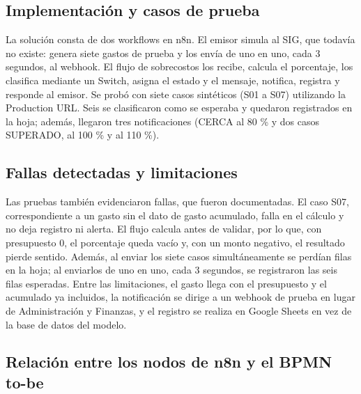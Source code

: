 \documentclass[11pt,letterpaper]{article}
\begin{document}
\subsection{Implementación y casos de prueba}

La solución consta de dos workflows en n8n. El emisor simula al SIG, que todavía no existe: genera siete gastos de prueba y los envía de uno en uno, cada 3 segundos, al webhook. El flujo de sobrecostos los recibe, calcula el porcentaje, los clasifica mediante un Switch, asigna el estado y el mensaje, notifica, registra y responde al emisor. Se probó con siete casos sintéticos (S01 a S07) utilizando la Production URL. Seis se clasificaron como se esperaba y quedaron registrados en la hoja; además, llegaron tres notificaciones (CERCA al 80 \% y dos casos SUPERADO, al 100 \% y al 110 \%).


\subsection{Fallas detectadas y limitaciones}

Las pruebas también evidenciaron fallas, que fueron documentadas. El caso S07, correspondiente a un gasto sin el dato de gasto acumulado, falla en el cálculo y no deja registro ni alerta. El flujo calcula antes de validar, por lo que, con presupuesto 0, el porcentaje queda vacío y, con un monto negativo, el resultado pierde sentido. Además, al enviar los siete casos simultáneamente se perdían filas en la hoja; al enviarlos de uno en uno, cada 3 segundos, se registraron las seis filas esperadas. Entre las limitaciones, el gasto llega con el presupuesto y el acumulado ya incluidos, la notificación se dirige a un webhook de prueba en lugar de Administración y Finanzas, y el registro se realiza en Google Sheets en vez de la base de datos del modelo.


\subsection{Relación entre los nodos de n8n y el BPMN to-be}
\end{document}
